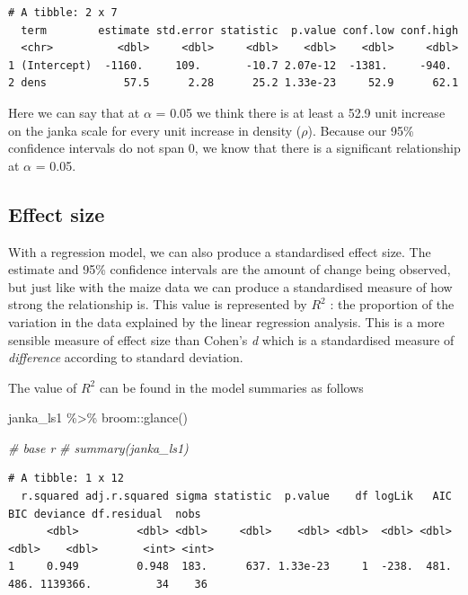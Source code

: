 \documentclass[
]{book}
\newenvironment{Shaded}{\begin{snugshade}}{\end{snugshade}}
\newcommand{\CommentTok}[1]{\textcolor[rgb]{0.56,0.35,0.01}{\textit{#1}}}
\newcommand{\FunctionTok}[1]{\textcolor[rgb]{0.00,0.00,0.00}{#1}}
\newcommand{\NormalTok}[1]{#1}
\newcommand{\SpecialCharTok}[1]{\textcolor[rgb]{0.00,0.00,0.00}{#1}}
\begin{document}
\begin{verbatim}
# A tibble: 2 x 7
  term        estimate std.error statistic  p.value conf.low conf.high
  <chr>          <dbl>     <dbl>     <dbl>    <dbl>    <dbl>     <dbl>
1 (Intercept)  -1160.     109.       -10.7 2.07e-12  -1381.     -940. 
2 dens            57.5      2.28      25.2 1.33e-23     52.9      62.1
\end{verbatim}

Here we can say that at \(\alpha\) = 0.05 we think there is at least a 52.9 unit increase on the janka scale for every unit increase in density (\(\rho\)). Because our 95\% confidence intervals do not span 0, we know that there is a significant relationship at \(\alpha\) = 0.05.

\hypertarget{effect-size}{%
\subsection{Effect size}\label{effect-size}}

With a regression model, we can also produce a standardised effect size. The estimate and 95\% confidence intervals are the amount of change being observed, but just like with the maize data we can produce a standardised measure of how strong the relationship is. This value is represented by \(R^2\) : the proportion of the variation in the data explained by the linear regression analysis. This is a more sensible measure of effect size than Cohen's \emph{d} which is a standardised measure of \emph{difference} according to standard deviation.

The value of \(R^2\) can be found in the model summaries as follows

\begin{Shaded}
\begin{Highlighting}[]
\NormalTok{janka\_ls1 }\SpecialCharTok{\%\textgreater{}\%} 
\NormalTok{  broom}\SpecialCharTok{::}\FunctionTok{glance}\NormalTok{()}

\CommentTok{\# base r}
\CommentTok{\# summary(janka\_ls1)}
\end{Highlighting}
\end{Shaded}

\begin{verbatim}
# A tibble: 1 x 12
  r.squared adj.r.squared sigma statistic  p.value    df logLik   AIC   BIC deviance df.residual  nobs
      <dbl>         <dbl> <dbl>     <dbl>    <dbl> <dbl>  <dbl> <dbl> <dbl>    <dbl>       <int> <int>
1     0.949         0.948  183.      637. 1.33e-23     1  -238.  481.  486. 1139366.          34    36
\end{verbatim}
\end{document}
